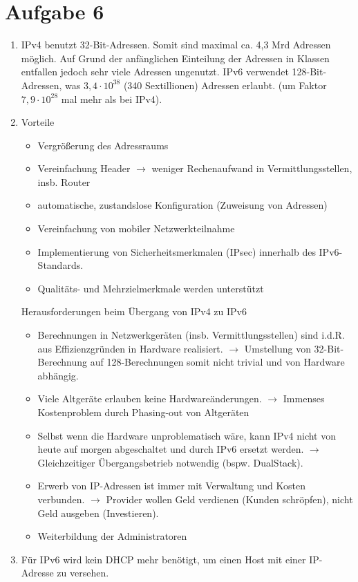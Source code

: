 \documentclass{article}
\begin{document}
	\section*{Aufgabe 6}
	\begin{enumerate}[label=(\alph*)]
		\item IPv4 benutzt 32-Bit-Adressen. Somit sind maximal ca. 4,3 Mrd Adressen möglich. Auf Grund der anfänglichen Einteilung der Adressen in Klassen entfallen jedoch sehr viele Adressen ungenutzt. IPv6 verwendet 128-Bit-Adressen, was $3,4\cdot 10^{38}$ (340 Sextillionen) Adressen erlaubt. (um Faktor $7,9\cdot 10^{28}$ mal mehr als bei IPv4).
		\item Vorteile
		\begin{itemize}
			\item Vergrößerung des Adressraums
			\item Vereinfachung Header $\to$ weniger Rechenaufwand in Vermittlungsstellen, insb. Router
			\item automatische, zustandslose Konfiguration (Zuweisung von Adressen)
			\item Vereinfachung von mobiler Netzwerkteilnahme
			\item Implementierung von Sicherheitsmerkmalen (IPsec) innerhalb des IPv6-Standards.
			\item Qualitäts- und Mehrzielmerkmale werden unterstützt
		\end{itemize}
		Herausforderungen beim Übergang von IPv4 zu IPv6
		\begin{itemize}
			\item Berechnungen in Netzwerkgeräten (insb. Vermittlungsstellen) sind i.d.R. aus Effizienzgründen in Hardware realisiert. $\to$ Umstellung von 32-Bit-Berechnung auf 128-Berechnungen somit nicht trivial und von Hardware abhängig.
			\item Viele Altgeräte erlauben keine Hardwareänderungen. $\to$ Immenses Kostenproblem durch Phasing-out von Altgeräten
			\item Selbst wenn die Hardware unproblematisch wäre, kann IPv4 nicht von heute auf morgen abgeschaltet und durch IPv6 ersetzt werden. $\to$ Gleichzeitiger Übergangsbetrieb notwendig (bspw. DualStack).
			\item Erwerb von IP-Adressen ist immer mit Verwaltung und Kosten verbunden. $\to$ Provider wollen Geld verdienen (Kunden schröpfen), nicht Geld ausgeben (Investieren).
			\item Weiterbildung der Administratoren
		\end{itemize}
		\item Für IPv6 wird kein DHCP mehr benötigt, um einen Host mit einer IP-Adresse zu versehen.

\end{enumerate}
\end{document}
